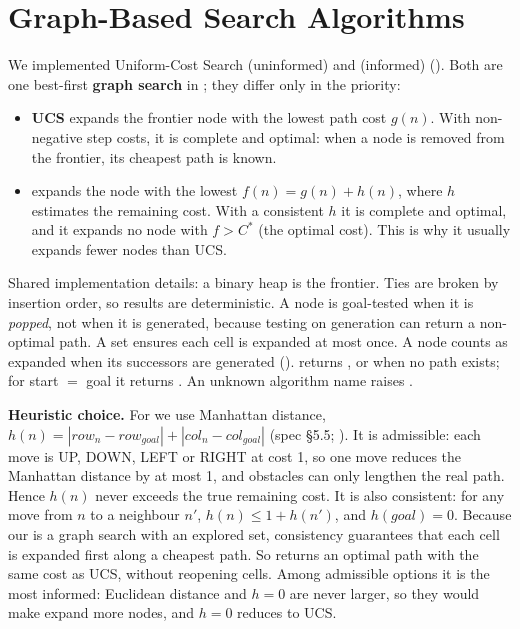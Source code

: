 \section{Graph-Based Search Algorithms}

We implemented Uniform-Cost Search (uninformed) and \astar{} (informed) (). Both are one
best-first \textbf{graph search} in ; they differ only in
the priority:
\begin{itemize}
  \item \textbf{UCS} expands the frontier node with the lowest path cost $g(n)$. With non-negative
    step costs, it is complete and optimal: when a node is removed from the frontier, its cheapest
    path is known.
  \item \textbf{\astar} expands the node with the lowest $f(n) = g(n) + h(n)$, where $h$ estimates
    the remaining cost. With a consistent $h$ it is complete and optimal, and it expands no node
    with $f > C^*$ (the optimal cost). This is why it usually expands fewer nodes than UCS.
\end{itemize}

Shared implementation details: a binary heap is the frontier. Ties are broken by insertion order,
so results are deterministic. A node is goal-tested when it is \emph{popped}, not when it is
generated, because testing on generation can return a non-optimal path. A  set ensures
each cell is expanded at most once. A node counts as expanded when its successors are generated
().  returns , or
 when no path exists; for start $=$ goal it returns
. An unknown algorithm name raises .

\textbf{Heuristic choice.} For \astar{} we use Manhattan distance,
$h(n) = |row_n - row_{goal}| + |col_n - col_{goal}|$ (spec §5.5; ). It is admissible:
each move is UP, DOWN, LEFT or RIGHT at cost 1, so one move reduces the Manhattan distance by at
most 1, and obstacles can only lengthen the real path. Hence $h(n)$ never exceeds the true remaining
cost. It is also consistent: for any move from $n$ to a neighbour $n'$, $h(n) \le 1 + h(n')$, and
$h(goal) = 0$. Because our \astar{} is a graph search with an explored set, consistency guarantees
that each cell is expanded first along a cheapest path. So \astar{} returns an optimal path with the
same cost as UCS, without reopening cells. Among admissible options it is the most informed:
Euclidean distance and $h = 0$ are never larger, so they would make \astar{} expand more nodes, and
$h = 0$ reduces \astar{} to UCS.

